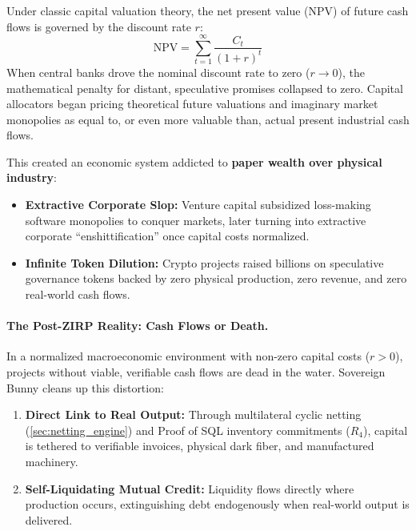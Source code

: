 \documentclass[a4paper,11pt,twoside,parskip=half-,headings=small]{scrartcl}
\begin{document}
Under classic capital valuation theory, the net present value (NPV) of future cash flows is governed by the discount rate $r$:
\begin{equation}
  \text{NPV} = \sum_{t=1}^{\infty} \frac{C_t}{(1 + r)^t}
\end{equation}
When central banks drove the nominal discount rate to zero ($r \to 0$), the mathematical penalty for distant, speculative
promises collapsed to zero. Capital allocators began pricing theoretical future valuations and imaginary market monopolies
as equal to, or even more valuable than, actual present industrial cash flows.

This created an economic system addicted to \textbf{paper wealth over physical industry}:
\begin{itemize}
  \item \textbf{Extractive Corporate Slop:} Venture capital subsidized loss-making software monopolies to conquer markets, later turning into extractive corporate ``enshittification'' once capital costs normalized.
  \item \textbf{Infinite Token Dilution:} Crypto projects raised billions on speculative governance tokens backed by zero physical production, zero revenue, and zero real-world cash flows.
\end{itemize}

\paragraph{The Post-ZIRP Reality: Cash Flows or Death.}
In a normalized macroeconomic environment with non-zero capital costs ($r > 0$), projects without viable, verifiable
cash flows are dead in the water. Sovereign Bunny cleans up this distortion:
\begin{enumerate}
  \item \textbf{Direct Link to Real Output:} Through multilateral cyclic netting (\cref{sec:netting_engine}) and Proof of SQL inventory commitments ($R_4$), capital is tethered to verifiable invoices, physical dark fiber, and manufactured machinery.
  \item \textbf{Self-Liquidating Mutual Credit:} Liquidity flows directly where production occurs, extinguishing debt endogenously when real-world output is delivered.
\end{enumerate}
\end{document}
